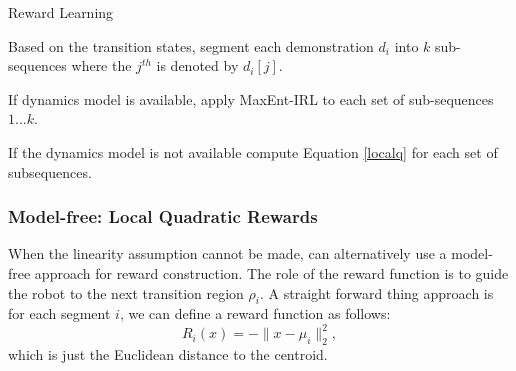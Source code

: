 \iffalse
\subsubsection{Application Scenarios} While typically RL is applied in scenarios where dynamics models are unavailable, there are scenarios in which the model-based reward approach applies. Suppose we are given demonstrations of a known system, e.g., a simulator or a simplified version of a task, with different dynamics $P'$ but with the same overall task structure.
While a policy learned in this setting would not transfer due to a change in dynamics, the reward function would.
In our experiments, we demonstrate an example of this on a surgical cutting task where the robot has to cut along a marked line in gauze.
We demonstrate cutting trajectories on a simplified cutting problem where the demonstrator quasi-statically traces the line without cutting it.
Here there are known dynamics and we can learn transitions and local rewards (e.g., learning to follow the line).
This reward can transfer to the policy learning phase, in which we can try to cut the gauze introducing unknown dynamics.
\fi


\begin{phase}[t]
\small
\DontPrintSemicolon
\caption{Reward Learning \label{alg:tsh2}}

Based on the transition states, segment each demonstration $d_i$ into $k$ sub-sequences where the $j^{th}$ is denoted by $d_i[j]$.

If dynamics model is available, apply MaxEnt-IRL to each set of sub-sequences $1...k$.

If the dynamics model is not available compute Equation \ref{localq} for each set of subsequences.

\end{phase}

\vspace{-15pt}
\subsubsection{Model-free: Local Quadratic Rewards}
When the linearity assumption cannot be made, \hirl can alternatively use a model-free approach for reward construction.
The role of the reward function is to guide the robot to the next transition region $\rho_i$.
A straight forward thing approach is for each segment $i$, we can define a reward function as follows:
\[
R_i(x) = -\|x - \mu_{i}\|_2^2, 
\]
which is just the Euclidean distance to the centroid.

